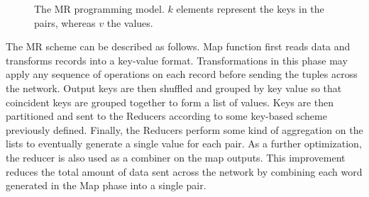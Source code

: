 \documentclass[3p,review]{elsarticle}
\begin{document}
\begin{figure}[!ht]
\centering {} \caption{The MR programming model. $k$ elements represent the keys in the pairs, whereas $v$ the values.}
\label{fig:mapreduce}
\end{figure}

The MR scheme can be described as follows. Map function first reads data and transforms records into a key-value format. Transformations in this phase may apply any sequence of operations on each record before sending the tuples across the network. Output keys are then shuffled and grouped by key value so that coincident keys are grouped together to form a list of values. Keys are then partitioned and sent to the Reducers according to some key-based scheme previously defined. Finally, the Reducers perform some kind of aggregation on the lists to eventually generate a single value for each pair. As a further optimization, the reducer is also used as a combiner on the map outputs. This improvement reduces the total amount of data sent across the network by combining each word generated in the Map phase into a single pair.

\end{document}
